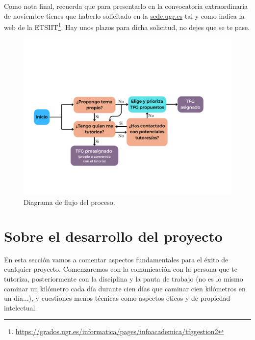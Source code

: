 Como nota final, recuerda que para presentarlo en la convocatoria extraordinaria de noviembre tienes que haberlo solicitado en la \url{sede.ugr.es} tal y como indica {la web de la ETSIIT}\footnote{\url{https://grados.ugr.es/informatica/pages/infoacademica/tfggestion2}}. Hay unos plazos para dicha solicitud, no dejes que se te pase.

\begin{figure}[!ht]
\centering
    \includegraphics[scale=0.5]{images/DecisionTFG.pdf}
    \caption{Diagrama de flujo del proceso.}\label{fg_diagrama_proceso}
\end{figure}


\section{Sobre el desarrollo del proyecto}


En esta sección vamos a comentar aspectos fundamentales para el éxito de cualquier proyecto. Comenzaremos con la comunicación con la persona que te tutoriza, posteriormente con la disciplina y la pauta de trabajo (no es lo mismo caminar un kilómetro cada día durante cien días que caminar cien kilómetros en un día...), y cuestiones menos técnicas como aspectos éticos y de propiedad intelectual.


